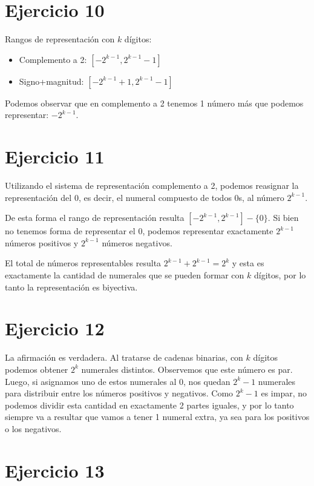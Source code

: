 \section{Ejercicio 10}

Rangos de representación con $k$ dígitos:

\begin{itemize}
  \item Complemento a 2: $[-2^{k-1}, 2^{k-1} - 1]$
  \item Signo+magnitud: $[-2^{k-1} + 1, 2^{k-1} - 1]$
\end{itemize}

Podemos observar que en complemento a 2 tenemos 1 número más que podemos representar: $-2^{k-1}$.

\section{Ejercicio 11}

Utilizando el sistema de representación complemento a 2, podemos reasignar la representación del $0$, es decir, el numeral compuesto de todos 0s, al número $2^{k-1}$.

De esta forma el rango de representación resulta $[-2^{k-1}, 2^{k-1}] - \{0\}$. Si bien no tenemos forma de representar el $0$, podemos representar exactamente $2^{k-1}$ números positivos y $2^{k-1}$ números negativos.

El total de números representables resulta $2^{k-1} + 2^{k-1} = 2^k$ y esta es exactamente la cantidad de numerales que se pueden formar con $k$ dígitos, por lo tanto la representación es biyectiva.

\section{Ejercicio 12}

La afirmación es verdadera. Al tratarse de cadenas binarias, con $k$ dígitos podemos obtener $2^k$ numerales distintos. Observemos que este número es par. Luego, si asignamos uno de estos numerales al $0$, nos quedan $2^k - 1$ numerales para distribuir entre los números positivos y negativos. Como $2^k - 1$ es impar, no podemos dividir esta cantidad en exactamente 2 partes iguales, y por lo tanto siempre va a resultar que vamos a tener 1 numeral extra, ya sea para los positivos o los negativos.

\section{Ejercicio 13}

